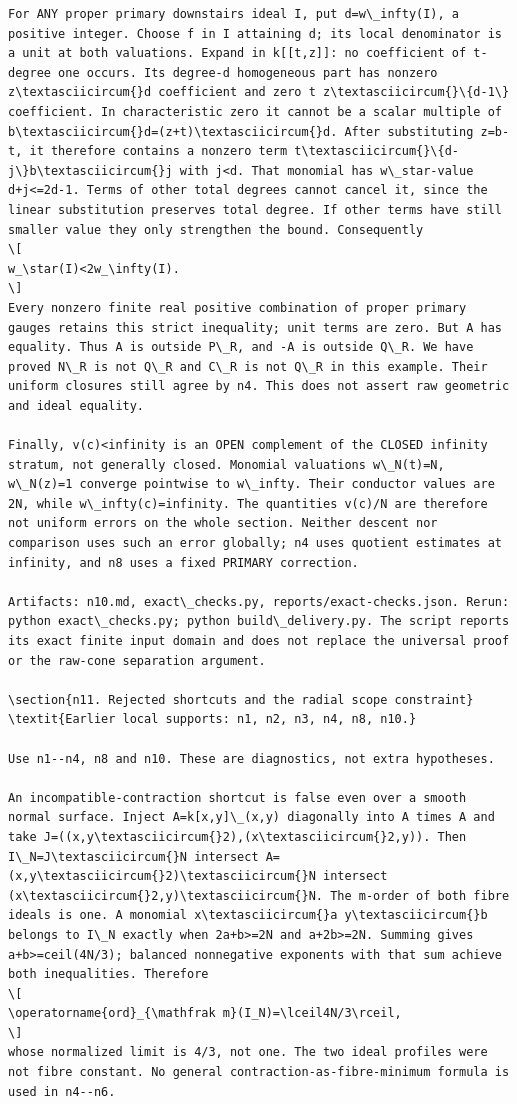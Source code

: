 \documentclass[11pt]{article}
\begin{document}
\begin{Verbatim}[fontsize=\tiny,breaklines=true,breakanywhere=true]
For ANY proper primary downstairs ideal I, put d=w\_infty(I), a positive integer. Choose f in I attaining d; its local denominator is a unit at both valuations. Expand in k[[t,z]]: no coefficient of t-degree one occurs. Its degree-d homogeneous part has nonzero z\textasciicircum{}d coefficient and zero t z\textasciicircum{}\{d-1\} coefficient. In characteristic zero it cannot be a scalar multiple of b\textasciicircum{}d=(z+t)\textasciicircum{}d. After substituting z=b-t, it therefore contains a nonzero term t\textasciicircum{}\{d-j\}b\textasciicircum{}j with j<d. That monomial has w\_star-value d+j<=2d-1. Terms of other total degrees cannot cancel it, since the linear substitution preserves total degree. If other terms have still smaller value they only strengthen the bound. Consequently
\[
w_\star(I)<2w_\infty(I).
\]
Every nonzero finite real positive combination of proper primary gauges retains this strict inequality; unit terms are zero. But A has equality. Thus A is outside P\_R, and -A is outside Q\_R. We have proved N\_R is not Q\_R and C\_R is not Q\_R in this example. Their uniform closures still agree by n4. This does not assert raw geometric and ideal equality.

Finally, v(c)<infinity is an OPEN complement of the CLOSED infinity stratum, not generally closed. Monomial valuations w\_N(t)=N, w\_N(z)=1 converge pointwise to w\_infty. Their conductor values are 2N, while w\_infty(c)=infinity. The quantities v(c)/N are therefore not uniform errors on the whole section. Neither descent nor comparison uses such an error globally; n4 uses quotient estimates at infinity, and n8 uses a fixed PRIMARY correction.

Artifacts: n10.md, exact\_checks.py, reports/exact-checks.json. Rerun: python exact\_checks.py; python build\_delivery.py. The script reports its exact finite input domain and does not replace the universal proof or the raw-cone separation argument.

\section{n11. Rejected shortcuts and the radial scope constraint}
\textit{Earlier local supports: n1, n2, n3, n4, n8, n10.}

Use n1--n4, n8 and n10. These are diagnostics, not extra hypotheses.

An incompatible-contraction shortcut is false even over a smooth normal surface. Inject A=k[x,y]\_(x,y) diagonally into A times A and take J=((x,y\textasciicircum{}2),(x\textasciicircum{}2,y)). Then I\_N=J\textasciicircum{}N intersect A=(x,y\textasciicircum{}2)\textasciicircum{}N intersect (x\textasciicircum{}2,y)\textasciicircum{}N. The m-order of both fibre ideals is one. A monomial x\textasciicircum{}a y\textasciicircum{}b belongs to I\_N exactly when 2a+b>=2N and a+2b>=2N. Summing gives a+b>=ceil(4N/3); balanced nonnegative exponents with that sum achieve both inequalities. Therefore
\[
\operatorname{ord}_{\mathfrak m}(I_N)=\lceil4N/3\rceil,
\]
whose normalized limit is 4/3, not one. The two ideal profiles were not fibre constant. No general contraction-as-fibre-minimum formula is used in n4--n6.


\end{Verbatim}
\end{document}
